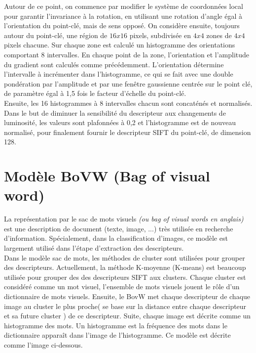 Autour de ce point, on commence par modifier le système de coordonnées local pour garantir l'invariance à la rotation, en utilisant une rotation d'angle égal à l'orientation du point-clé, mais de sens opposé. On considère ensuite, toujours autour du point-clé, une région de $16x16$ pixels, subdivisée en $4x4$ zones de $4x4$ pixels chacune. Sur chaque zone est calculé un histogramme des orientations comportant 8 intervalles. En chaque point de la zone, l'orientation et l'amplitude du gradient sont calculés comme précédemment. L'orientation détermine l'intervalle à incrémenter dans l'histogramme, ce qui se fait avec une double pondération par l'amplitude et par une fenêtre gaussienne centrée sur le point clé, de paramètre égal à 1,5 fois le facteur d'échelle du point-clé\cite{low04}.\\

Ensuite, les 16 histogrammes à 8 intervalles chacun sont concaténés et normalisés. Dans le but de diminuer la sensibilité du descripteur aux changements de luminosité, les valeurs sont plafonnées à 0,2 et l'histogramme est de nouveau normalisé, pour finalement fournir le descripteur SIFT du point-clé, de dimension 128.

\section{Modèle BoVW (Bag of visual word)}
La représentation par le sac de mots visuels \textit{(ou bag of visual words en anglais)} est une description de document (texte, image, ...) très utilisée en recherche d'information. Spécialement, dans la classification d'images, ce modèle est largement utilisé dans l'étape d'extraction des descripteurs.\\

Dans le modèle sac de mots, les méthodes de cluster sont utilisées pour grouper des  descripteurs. Actuellement, la méthode K-moyenne (K-means)\cite{jm67} est beaucoup utilisée pour grouper des des descripteurs SIFT aux clusters. Chaque cluster est considéré comme un mot visuel, l'ensemble de mots visuels jouent le rôle d'un dictionnaire de mots visuels. Ensuite, le BovW met chaque descripteur de chaque image au cluster le plus proche( se base sur la distance entre chaque descripteur et sa future cluster ) de ce descripteur. Suite, chaque image est décrite comme un histogramme des mots. Un histogramme est la fréquence des mots dans le dictionnaire apparaît dans l'image de l'histogramme. Ce modèle est décrite comme l'image ci-dessous.


